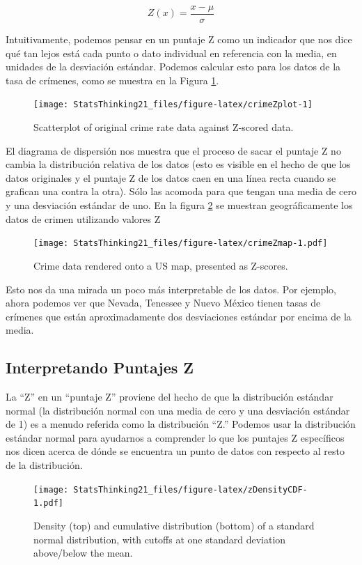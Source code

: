 \documentclass[
  12pt,
]{book}
\begin{document}
\[
Z(x) = \frac{x - \mu}{\sigma}
\]

Intuitivamente, podemos pensar en un puntaje Z como un indicador que nos dice qué tan lejos está cada punto o dato individual en referencia con la media, en unidades de la desviación estándar. Podemos calcular esto para los datos de la tasa de crímenes, como se muestra en la Figura \ref{fig:crimeZplot}.

\begin{figure}
\texttt{[image: StatsThinking21\_files/figure-latex/crimeZplot-1]} \caption{Scatterplot of original crime rate data against Z-scored data.}\label{fig:crimeZplot}
\end{figure}

El diagrama de dispersión nos muestra que el proceso de sacar el puntaje Z no cambia la distribución relativa de los datos (esto es visible en el hecho de que los datos originales y el puntaje Z de los datos caen en una línea recta cuando se grafican una contra la otra).
Sólo las acomoda para que tengan una media de cero y una desviación estándar de uno. En la figura \ref{fig:crimeZmap} se muestran geográficamente los datos de crimen utilizando valores Z

\begin{figure}
\centering
\texttt{[image: StatsThinking21\_files/figure-latex/crimeZmap-1.pdf]}
\caption{\label{fig:crimeZmap}Crime data rendered onto a US map, presented as Z-scores.}
\end{figure}

Esto nos da una mirada un poco más interpretable de los datos. Por ejemplo, ahora podemos ver que Nevada, Tenessee y Nuevo México tienen tasas de crímenes que están aproximadamente dos desviaciones estándar por encima de la media.

\hypertarget{interpretando-puntajes-z}{%
\subsection{Interpretando Puntajes Z}\label{interpretando-puntajes-z}}

La ``Z'' en un ``puntaje Z'' proviene del hecho de que la distribución estándar normal (la distribución normal con una media de cero y una desviación estándar de 1) es a menudo referida como la distribución ``Z.'' Podemos usar la distribución estándar normal para ayudarnos a comprender lo que los puntajes Z específicos nos dicen acerca de dónde se encuentra un punto de datos con respecto al resto de la distribución.

\begin{figure}
\centering
\texttt{[image: StatsThinking21\_files/figure-latex/zDensityCDF-1.pdf]}
\caption{\label{fig:zDensityCDF}Density (top) and cumulative distribution (bottom) of a standard normal distribution, with cutoffs at one standard deviation above/below the mean.}
\end{figure}
\end{document}
